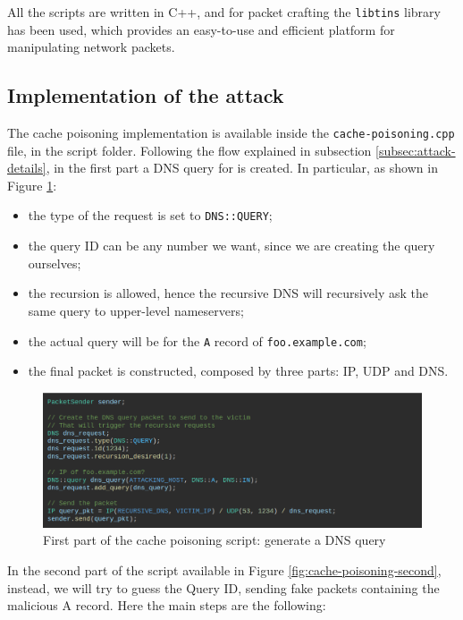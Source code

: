 \documentclass[11pt,a4paper]{article}
\begin{document}
\noindent
All the scripts are written in C++, and for packet crafting the \texttt{libtins} library has been used, which provides an easy-to-use and efficient platform for manipulating network packets.

\subsection{Implementation of the attack}
The cache poisoning implementation is available inside the \texttt{cache-poisoning.cpp} file, in the script folder. Following the flow explained in subsection \ref{subsec:attack-details}, in the first part a DNS query for is created. In particular, as shown in Figure \ref{fig:cache-poisoning-first}:
\begin{itemize}
    \item the type of the request is set to \texttt{DNS::QUERY};
    \item the query ID can be any number we want, since we are creating the query ourselves;
    \item the recursion is allowed, hence the recursive DNS will recursively ask the same query to upper-level nameservers;
    \item the actual query will be for the \texttt{A} record of \texttt{foo.example.com};
    \item the final packet is constructed, composed by three parts: IP, UDP and DNS.
\end{itemize}

\begin{figure}[h]
    \centering
    \includegraphics[width=\textwidth]{cache-poisoning-first.png}
    \caption{First part of the cache poisoning script: generate a DNS query}
    \label{fig:cache-poisoning-first}
\end{figure}

\noindent
In the second part of the script available in Figure \ref{fig:cache-poisoning-second}, instead, we will try to guess the Query ID, sending fake packets containing the malicious A record. Here the main steps are the following:
\end{document}
